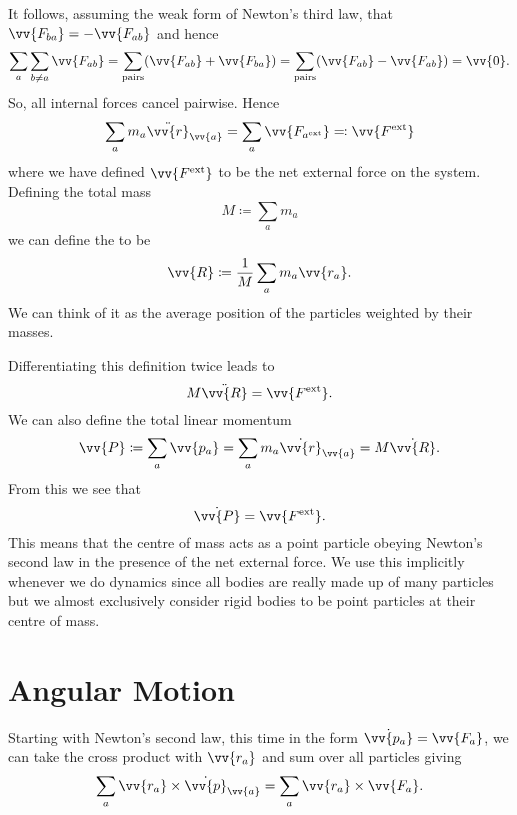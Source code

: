 \documentclass[fleqn]{NotesClass}
\newcommand*{\ext}{\mathrm{ext}}
\begin{document}
    It follows, assuming the weak form of Newton's third law, that \(\vv{F_{ba}} = -\vv{F_{ab}}\) and hence
    \begin{equation}
        \sum_{a}\sum_{b\ne a} \vv{F_{ab}} = \sum_{\text{pairs}}(\vv{F_{ab}} + \vv{F_{ba}}) = \sum_{\text{pairs}} (\vv{F_{ab}} - \vv{F_{ab}}) = \vv{0}.
    \end{equation}
    So, all internal forces cancel pairwise.
    Hence
    \begin{equation}
        \sum_a m_a\ddot{\vv{r}}_{\vv{a}} = \sum_a \vv{F_{a^{\ext}}} \eqqcolon \vv{F^{\ext}}
    \end{equation}
    where we have defined \(\vv{F^{\ext}}\) to be the net external force on the system.
    Defining the total mass
    \begin{equation}
        M \coloneqq \sum_a m_a
    \end{equation}
    we can define the  to be
    \begin{equation}
        \vv{R} \coloneqq \frac{1}{M}\sum_a m_a\vv{r_a}.
    \end{equation}
    We can think of it as the average position of the particles weighted by their masses.
    
    Differentiating this definition twice leads to
    \begin{equation}
        M\ddot{\vv{R}} = \vv{F^{\ext}}.
    \end{equation}
    We can also define the total linear momentum
    \begin{equation}
        \vv{P} \coloneqq \sum_a \vv{p_a} = \sum_a m_a \dot{\vv{r}}_{\vv{a}} = M\dot{\vv{R}}.
    \end{equation}
    From this we see that
    \begin{equation}
        \dot{\vv{P}} = \vv{F^{\ext}}.
    \end{equation}
    This means that the centre of mass acts as a point particle obeying Newton's second law in the presence of the net external force.
    We use this implicitly whenever we do dynamics since all bodies are really made up of many particles but we almost exclusively consider rigid bodies to be point particles at their centre of mass.
    
    \section{Angular Motion}
    Starting with Newton's second law, this time in the form \(\dot{\vv{p_a}} = \vv{F_a}\), we can take the cross product with \(\vv{r_a}\) and sum over all particles giving
    \begin{equation}\label{eqn:angular motion system of particles}
        \sum_a \vv{r_a}\times\dot{\vv{p}}_{\vv{a}} = \sum_a \vv{r_a}\times\vv{F_a}.
    \end{equation}
\end{document}
